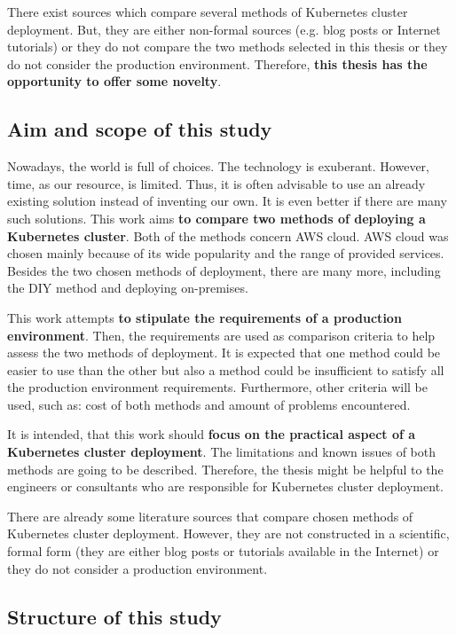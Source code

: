 There exist sources which compare several methods of Kubernetes cluster deployment. But, they are either non-formal sources (e.g. blog posts or Internet tutorials) or they do not compare the two methods selected in this thesis or they do not consider the production environment. Therefore, \textbf{this thesis has the opportunity to offer some novelty}.

\subsection{Aim and scope of this study}


Nowadays, the world is full of choices. The technology is exuberant. However, time, as our resource, is limited. Thus, it is often advisable to use an already existing solution instead of inventing our own. It is even better if there are many such solutions. This work aims \textbf{to compare two methods of deploying a Kubernetes cluster}. Both of the methods concern AWS cloud. AWS cloud was chosen mainly because of its wide popularity and the range of provided services. Besides the two chosen methods of deployment, there are many more, including the DIY method and deploying on-premises.

This work attempts \textbf{to stipulate the requirements of a production environment}. Then, the requirements are used as comparison criteria to help assess the two methods of deployment. It is expected that one method could be easier to use than the other but also a method could be insufficient to satisfy all the production environment requirements. Furthermore, other criteria will be used, such as: cost of both methods and amount of problems encountered.

It is intended, that this work should \textbf{focus on the practical aspect of a Kubernetes cluster deployment}. The limitations and known issues of both methods are going to be described. Therefore, the thesis might be helpful to the engineers or consultants who are responsible for Kubernetes cluster deployment.

There are already some literature sources that compare chosen methods of Kubernetes cluster deployment. However, they are not constructed in a scientific, formal form (they are either blog posts or tutorials available in the Internet) or they do not consider a production environment.

\subsection{Structure of this study}


